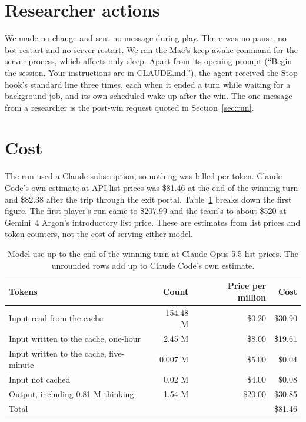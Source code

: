 \documentclass[11pt,a4paper]{article}
\begin{document}
\section{Researcher actions}
\label{sec:actions}

We made no change and sent no message during play. There was no pause, no bot restart and no server restart. We ran the Mac's keep-awake command for the server process, which affects only sleep. Apart from its opening prompt (``Begin the session. Your instructions are in CLAUDE.md.''), the agent received the Stop hook's standard line three times, each when it ended a turn while waiting for a background job, and its own scheduled wake-up after the win. The one message from a researcher is the post-win request quoted in Section~\ref{sec:run}.

\section{Cost}
\label{sec:cost}

The run used a Claude subscription, so nothing was billed per token. Claude Code's own estimate at API list prices was \$81.46 at the end of the winning turn and \$82.38 after the trip through the exit portal. Table~\ref{tab:cost} breaks down the first figure. The first player's run came to \$207.99 and the team's to about \$520 at Gemini~4 Argon's introductory list price. These are estimates from list prices and token counters, not the cost of serving either model.

\begin{table}[t]
  \caption{Model use up to the end of the winning turn at Claude Opus 5.5 list prices. The unrounded rows add up to Claude Code's own estimate.}
  \label{tab:cost}
  \small
  \begin{tabularx}{\textwidth}{@{}Xrrr@{}}
    \toprule
    \textbf{Tokens} & \textbf{Count} & \textbf{Price per million} & \textbf{Cost} \\
    \midrule
    Input read from the cache & 154.48 M & \$0.20 & \$30.90 \\
    Input written to the cache, one-hour & 2.45 M & \$8.00 & \$19.61 \\
    Input written to the cache, five-minute & 0.007 M & \$5.00 & \$0.04 \\
    Input not cached & 0.02 M & \$4.00 & \$0.08 \\
    Output, including 0.81 M thinking & 1.54 M & \$20.00 & \$30.85 \\
    \midrule
    Total & & & \$81.46 \\
    \bottomrule
  \end{tabularx}
\end{table}
\end{document}

